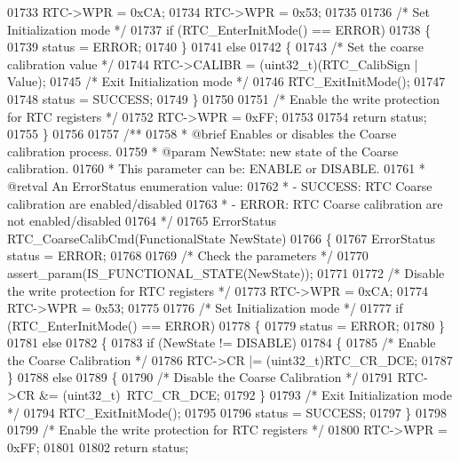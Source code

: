 \begin{DoxyCode}
01733   RTC->WPR = 0xCA;
01734   RTC->WPR = 0x53;
01735 
01736   \textcolor{comment}{/* Set Initialization mode */}
01737   \textcolor{keywordflow}{if} (RTC_EnterInitMode() == ERROR)
01738   \{
01739     status = ERROR;
01740   \}
01741   \textcolor{keywordflow}{else}
01742   \{
01743     \textcolor{comment}{/* Set the coarse calibration value */}
01744     RTC->CALIBR = (uint32\_t)(RTC\_CalibSign | Value);
01745     \textcolor{comment}{/* Exit Initialization mode */}
01746     RTC_ExitInitMode();
01747 
01748     status = SUCCESS;
01749   \}
01750 
01751   \textcolor{comment}{/* Enable the write protection for RTC registers */}
01752   RTC->WPR = 0xFF;
01753 
01754   \textcolor{keywordflow}{return} status;
01755 \}
01756 
01757 \textcolor{comment}{/**}
01758 \textcolor{comment}{  * @brief  Enables or disables the Coarse calibration process.}
01759 \textcolor{comment}{  * @param  NewState: new state of the Coarse calibration.}
01760 \textcolor{comment}{  *          This parameter can be: ENABLE or DISABLE.}
01761 \textcolor{comment}{  * @retval An ErrorStatus enumeration value:}
01762 \textcolor{comment}{  *          - SUCCESS: RTC Coarse calibration are enabled/disabled}
01763 \textcolor{comment}{  *          - ERROR: RTC Coarse calibration are not enabled/disabled    }
01764 \textcolor{comment}{  */}
01765 ErrorStatus RTC_CoarseCalibCmd(FunctionalState NewState)
01766 \{
01767   ErrorStatus status = ERROR;
01768 
01769   \textcolor{comment}{/* Check the parameters */}
01770   assert_param(IS\_FUNCTIONAL\_STATE(NewState));
01771 
01772   \textcolor{comment}{/* Disable the write protection for RTC registers */}
01773   RTC->WPR = 0xCA;
01774   RTC->WPR = 0x53;
01775 
01776   \textcolor{comment}{/* Set Initialization mode */}
01777   \textcolor{keywordflow}{if} (RTC_EnterInitMode() == ERROR)
01778   \{
01779     status =  ERROR;
01780   \}
01781   \textcolor{keywordflow}{else}
01782   \{
01783     \textcolor{keywordflow}{if} (NewState != DISABLE)
01784     \{
01785       \textcolor{comment}{/* Enable the Coarse Calibration */}
01786       RTC->CR |= (uint32\_t)RTC_CR_DCE;
01787     \}
01788     \textcolor{keywordflow}{else}
01789     \{
01790       \textcolor{comment}{/* Disable the Coarse Calibration */}
01791       RTC->CR &= (uint32\_t)~RTC_CR_DCE;
01792     \}
01793     \textcolor{comment}{/* Exit Initialization mode */}
01794     RTC_ExitInitMode();
01795 
01796     status = SUCCESS;
01797   \}
01798 
01799   \textcolor{comment}{/* Enable the write protection for RTC registers */}
01800   RTC->WPR = 0xFF;
01801 
01802   \textcolor{keywordflow}{return} status;

\end{DoxyCode}
